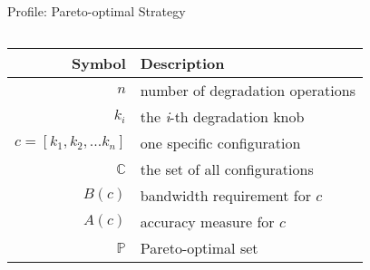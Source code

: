 \begin{frame}{Profile: Pareto-optimal Strategy}
\begin{columns}
    \begin{column}{0.59\linewidth}
      \scriptsize
      \begin{table}
        \centering
        \begin{tabular}{r l}
          \toprule
          \textbf{Symbol} & \textbf{Description} \\
          \midrule
          $n$ & number of degradation operations \\
          $k_i$ & the \textit{i}-th degradation knob \\
          $c = [k_{1}, k_{2}, ... k_{n}]$ & one specific configuration \\
          $\mathbb{C}$ & the set of all configurations \\
          \midrule
          \alert{$B(c)$} & bandwidth requirement for $c$ \\
          \alert{$A(c)$} & accuracy measure for $c$ \\
          $\mathbb{P}$ & Pareto-optimal set \\
          \bottomrule
        \end{tabular}
      \end{table}

        
    \end{column}
  \end{columns}
\end{frame}


